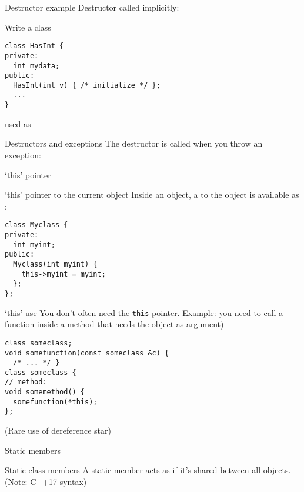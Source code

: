\begin{slide}{Destructor example}
  \label{sl:class-destruct-ex2}
  Destructor called implicitly:
\end{slide}

\begin{exercise}
  \label{ex:destruct-trace}
  Write a class
\begin{lstlisting}
class HasInt {
private:
  int mydata;
public:
  HasInt(int v) { /* initialize */ };
  ...
}
\end{lstlisting}
used as
%
\end{exercise}

\begin{block}{Destructors and exceptions}
  \label{sl:exceptobj}
  The destructor is called when you throw an exception:
\end{block}

 {`this' pointer}

\begin{block}{`this' pointer to the current object}
  \label{sl:class-this}
  Inside an object, a  to the object is available
  as :
\begin{lstlisting}
class Myclass {
private:
  int myint;
public:
  Myclass(int myint) {
    this->myint = myint;
  };
};
\end{lstlisting}
\end{block}

\begin{block}{`this' use}
  \label{sl:class-this-fun}
You don't often need the \lstinline{this} pointer. Example:
you need to call a function inside a method that needs the object as argument)
\begin{lstlisting}
class someclass;
void somefunction(const someclass &c) {
  /* ... */ }
class someclass {
// method:
void somemethod() {
  somefunction(*this);
};
\end{lstlisting}
(Rare use of dereference star)
\end{block}

 {Static members}

\begin{block}{Static class members}
  \label{sl:static-member}
  A static member acts as if it's shared between all objects.\\
  (Note: C++17 syntax)
\end{block}

